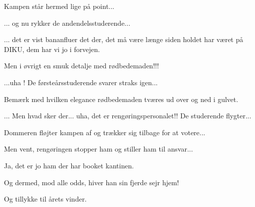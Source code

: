 \documentclass[a4paper,11pt]{article}
\begin{document}
\begin{sketch}
   Kampen står hermed lige på point...

   ... og nu rykker de andendelsstuderende...


   ... det er vist bananfluer det der, det må være længe siden
  holdet har været på DIKU, dem har vi jo i forvejen.

   Men i øvrigt en smuk detalje med rødbedemaden!!!


   ...uha !  De førsteårsstuderende svarer straks igen...

   Bemærk med hvilken elegance rødbedemaden tværes ud over og ned i gulvet.


   ... Men hvad sker der... uha, det er rengøringspersonalet!! De studerende flygter...

   Dommeren fløjter kampen af og trækker sig tilbage for at votere...

   Men vent, rengøringen stopper ham og stiller ham til ansvar...

   Ja, det er jo ham der har booket kantinen.

   Og dermed, mod alle odds, hiver han sin fjerde sejr hjem!

   Og tillykke til årets vinder.
\end{sketch}
\end{document}
